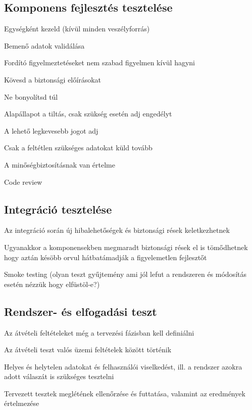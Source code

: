 \documentclass[a4paper,14pt, twocolumn]{extarticle}
\begin{document}
		\subsection{Komponens fejlesztés tesztelése}
			\begin{compactitem}
				\item Egységként kezeld (kívül minden veszélyforrás) 
				\item Bemenő adatok validálása 
				\item Fordító figyelmeztetéseket nem szabad figyelmen kívül hagyni 
				\item Kövesd a biztonsági előírásokat 
				\item Ne bonyolítsd túl 
				\item Alapállapot a tiltás, csak szükség esetén adj engedélyt 
				\item A lehető legkevesebb jogot adj 
				\item Csak a feltétlen szükséges adatokat küld tovább 
				\item A minőségbiztosításnak van értelme 
				\item Code review
			\end{compactitem}
		\subsection{Integráció tesztelése}
			\begin{compactitem}
				\item Az integráció során új hibalehetőségek és biztonsági rések keletkezhetnek 
				\item Ugyanakkor a komponensekben megmaradt biztonsági rések el is tömődhetnek hogy aztán késöbb orvul hátbatámadják a figyelemetlen fejlesztőt 
				\item Smoke testing (olyan teszt gyűjtemény ami jól lefut a rendszeren és módosítás esetén nézzük hogy elfüstöl-e?)
			\end{compactitem}
		\subsection{Rendszer- és elfogadási teszt}
			\begin{compactitem}
				\item Az átvételi feltételeket még a tervezési fázisban kell definiálni 
				\item Az átvételi teszt valós üzemi feltételek között történik 
				\item Helyes és helytelen adatokat és felhasználói viselkedést, ill. a rendszer azokra adott válaszát is szükséges tesztelni 
				\item Tervezett tesztek meglétének ellenőrzése és futtatása, valamint az eredmények értelmezése
			\end{compactitem}
\end{document}
